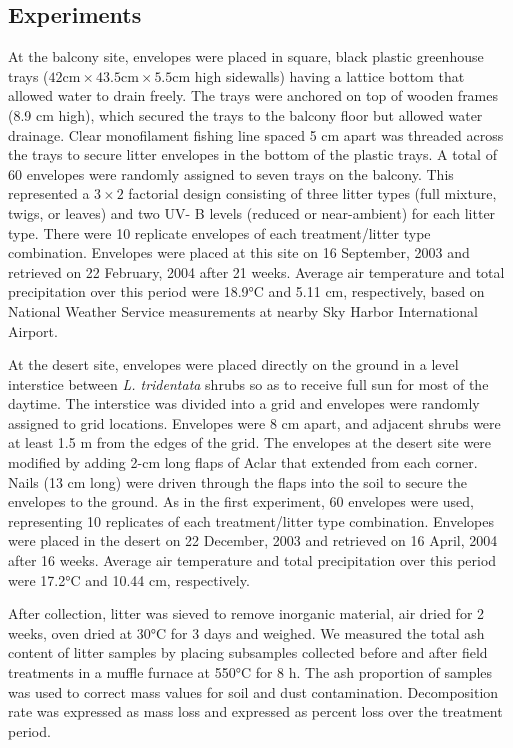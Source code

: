 \documentclass[
]{article}
\begin{document}
\subsection{Experiments}\label{experiments}

At the balcony site, envelopes were placed in square, black plastic
greenhouse trays
(\(42 \text{cm} \times 43.5 \text{cm} \times 5.5 \text{cm}\) high
sidewalls) having a lattice bottom that allowed water to drain freely.
The trays were anchored on top of wooden frames (8.9 cm high), which
secured the trays to the balcony floor but allowed water drainage. Clear
monofilament fishing line spaced 5 cm apart was threaded across the
trays to secure litter envelopes in the bottom of the plastic trays. A
total of 60 envelopes were randomly assigned to seven trays on the
balcony. This represented a \(3 \times 2\) factorial design consisting
of three litter types (full mixture, twigs, or leaves) and two UV- B
levels (reduced or near-ambient) for each litter type. There were 10
replicate envelopes of each treatment/litter type combination. Envelopes
were placed at this site on 16 September, 2003 and retrieved on 22
February, 2004 after 21 weeks. Average air temperature and total
precipitation over this period were 18.9°C and 5.11 cm, respectively,
based on National Weather Service measurements at nearby Sky Harbor
International Airport.

At the desert site, envelopes were placed directly on the ground in a
level interstice between \emph{L. tridentata} shrubs so as to receive
full sun for most of the daytime. The interstice was divided into a grid
and envelopes were randomly assigned to grid locations. Envelopes were 8
cm apart, and adjacent shrubs were at least 1.5 m from the edges of the
grid. The envelopes at the desert site were modified by adding 2-cm long
flaps of Aclar that extended from each corner. Nails (13 cm long) were
driven through the flaps into the soil to secure the envelopes to the
ground. As in the first experiment, 60 envelopes were used, representing
10 replicates of each treatment/litter type combination. Envelopes were
placed in the desert on 22 December, 2003 and retrieved on 16 April,
2004 after 16 weeks. Average air temperature and total precipitation
over this period were 17.2°C and 10.44 cm, respectively.

After collection, litter was sieved to remove inorganic material, air
dried for 2 weeks, oven dried at 30°C for 3 days and weighed. We
measured the total ash content of litter samples by placing subsamples
collected before and after field treatments in a muffle furnace at 550°C
for 8 h. The ash proportion of samples was used to correct mass values
for soil and dust contamination. Decomposition rate was expressed as
mass loss and expressed as percent loss over the treatment period.
\end{document}

